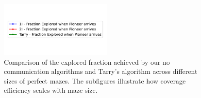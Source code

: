 \begin{figure}[H]
    \centering
    \qquad
    \qquad
    \includegraphics[width=0.5\textwidth]{Cap3/no_comm_fraction_legend.pdf}
    \newline
    \qquad
    \newline
    \qquad
    \caption{Comparison of the explored fraction achieved by our no-communication algorithms and Tarry's algorithm across different sizes of perfect mazes. The subfigures illustrate how coverage efficiency scales with maze size.}
    \label{fig_no_comm_fraction_all_sizes_maze}
\end{figure}

